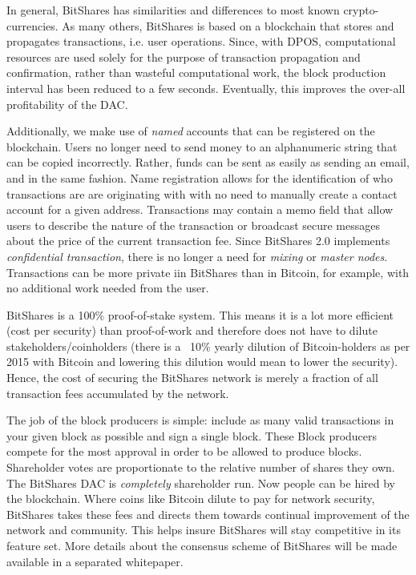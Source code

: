 In general, BitShares has similarities and differences to most known
crypto-currencies. As many others, BitShares is based on a blockchain that
stores and propagates transactions, i.e. user operations. Since, with DPOS,
computational resources are used solely for the purpose of transaction
propagation and confirmation, rather than wasteful computational work, the
block production interval has been reduced to a few seconds. Eventually, this
improves the over-all profitability of the DAC.

Additionally, we make use of \emph{named} accounts that can be registered on
the blockchain. Users no longer need to send money to an alphanumeric string
that can be copied incorrectly. Rather, funds can be sent as easily as sending
an email, and in the same fashion. Name registration allows for the
identification of who transactions are are originating with with no need to
manually create a contact account for a given address. Transactions may contain
a memo field that allow users to describe the nature of the transaction or
broadcast secure messages about the price of the current transaction fee. Since
BitShares 2.0 implements \emph{confidential transaction}, there is no longer a
need for \emph{mixing} or \emph{master nodes}. Transactions can be more private
iin BitShares than in Bitcoin, for example, with no additional work needed from
the user.

BitShares is a 100\% proof-of-stake system. This means it is a lot more
efficient (cost per security) than proof-of-work and therefore does not have to
dilute stakeholders/coinholders (there is a ~10\% yearly dilution of
Bitcoin-holders as per 2015 with Bitcoin and lowering this dilution would mean
to lower the security). Hence, the cost of securing the BitShares network is
merely a fraction of all transaction fees accumulated by the network. 

The job of the block producers is simple: include as many valid transactions in
your given block as possible and sign a single block. These Block producers
compete for the most approval in order to be allowed to produce blocks.
Shareholder votes are proportionate to the relative number of shares they own.
The BitShares DAC is \emph{completely} shareholder run. Now people can be hired
by the blockchain. Where coins like Bitcoin dilute to pay for network security,
BitShares takes these fees and directs them towards continual improvement of
the network and community. This helps insure BitShares will stay competitive in
its feature set. More details about the consensus scheme of BitShares will be
made available in a separated whitepaper.


